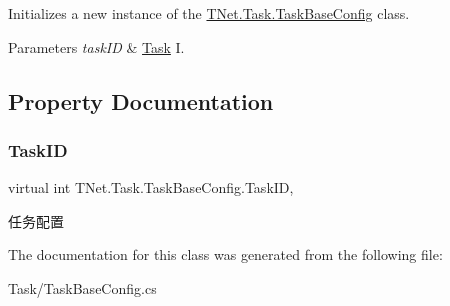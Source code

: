 Initializes a new instance of the \mbox{\hyperlink{class_t_net_1_1_task_1_1_task_base_config}{T\+Net.\+Task.\+Task\+Base\+Config}} class. 


\begin{DoxyParams}{Parameters}
{\em task\+ID} & \mbox{\hyperlink{namespace_t_net_1_1_task}{Task}} I.\\
\hline
\end{DoxyParams}


\subsection{Property Documentation}
\mbox{\label{class_t_net_1_1_task_1_1_task_base_config_ab77a73119b7ae0af25fa336038dd4e72}} 
\subsubsection{\texorpdfstring{Task\+ID}{TaskID}}
{\footnotesize\ttfamily virtual int T\+Net.\+Task.\+Task\+Base\+Config.\+Task\+ID\hspace{0.3cm}{\ttfamily [get]}, {\ttfamily [set]}}



任务配置 



The documentation for this class was generated from the following file\+:\begin{DoxyCompactItemize}
\item 
Task/Task\+Base\+Config.\+cs\end{DoxyCompactItemize}
